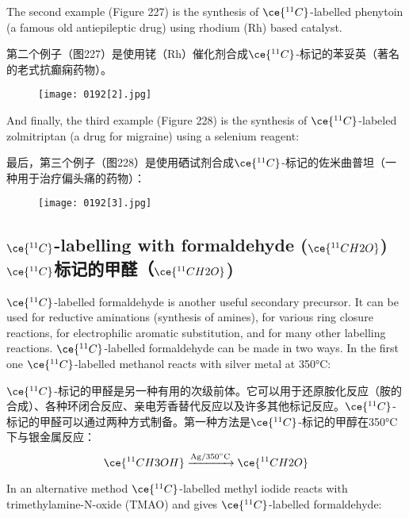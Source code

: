 \documentclass[dvipsnames, svgnames,a4paper,11pt]{article}
\begin{document}
The second example (Figure 227) is the synthesis of \(\ce{^{11}C}\)-labelled phenytoin (a famous old antiepileptic drug) using rhodium (Rh) based catalyst.

第二个例子（图227）是使用铑（Rh）催化剂合成\(\ce{^{11}C}\)-标记的苯妥英（著名的老式抗癫痫药物）。

\begin{figure}[h]
	\centering
    \texttt{[image: 0192[2].jpg]}  
     \label{fig227}
\end{figure}


And finally, the third example (Figure 228) is the synthesis of \(\ce{^{11}C}\)-labeled zolmitriptan (a drug for migraine) using a selenium reagent:

最后，第三个例子（图228）是使用硒试剂合成\(\ce{^{11}C}\)-标记的佐米曲普坦（一种用于治疗偏头痛的药物）：

\begin{figure}[h]
	\centering
    \texttt{[image: 0192[3].jpg]}  
     \label{fig228}
\end{figure}

\subsection{\(\ce{^{11}C}\)-labelling with formaldehyde (\(\ce{^{11}CH2O}\)) \\ \(\ce{^{11}C}\)标记的甲醛（\(\ce{^{11}CH2O}\))}  
\(\ce{^{11}C}\)-labelled formaldehyde is another useful secondary precursor. It can be used for reductive aminations (synthesis of amines), for various ring closure reactions, for electrophilic aromatic substitution, and for many other labelling reactions. \(\ce{^{11}C}\)-labelled formaldehyde can be made in two ways. In the first one \(\ce{^{11}C}\)-labelled methanol reacts with silver metal at 350°C:  

\(\ce{^{11}C}\)-标记的甲醛是另一种有用的次级前体。它可以用于还原胺化反应（胺的合成）、各种环闭合反应、亲电芳香替代反应以及许多其他标记反应。\(\ce{^{11}C}\)-标记的甲醛可以通过两种方式制备。第一种方法是\(\ce{^{11}C}\)-标记的甲醇在350°C下与银金属反应：  
\[
\ce{^{11}CH3OH} \xrightarrow{\mathrm{Ag/350^\circ C}} \ce{^{11}CH2O}
\]

In an alternative method \(\ce{^{11}C}\)-labelled methyl iodide reacts with trimethylamine-N-oxide (TMAO) and gives \(\ce{^{11}C}\)-labelled formaldehyde:  
\end{document}
